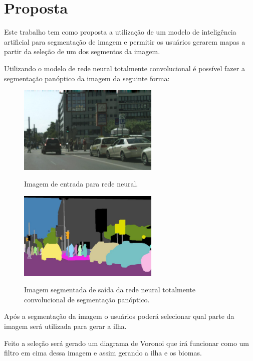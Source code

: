 \section{Proposta}

Este trabalho tem como proposta a utilização de um modelo de inteligência artificial para segmentação de imagem e permitir os usuários gerarem mapas a partir da seleção de um dos segmentos da imagem.

Utilizando o modelo de rede neural totalmente convolucional é possível fazer a segmentação panóptico da imagem da seguinte forma:

\begin{figure}[!ht]
	\centering
    \caption{Imagem de entrada para rede neural.}
	\includegraphics[width=0.6\textwidth]{figures/segmantations_1.png}
	\label{fig:segmantations_1}
\end{figure}

\begin{figure}[!ht]
	\centering
    \caption{Imagem segmentada de saída da rede neural totalmente convolucional de segmentação panóptico.}
	\includegraphics[width=0.6\textwidth]{figures/segmantations_2.png}
	\label{fig:segmantations_2}
\end{figure}

Após a segmentação da imagem o usuários poderá selecionar qual parte da imagem será utilizada para gerar a ilha.

Feito a seleção será gerado um diagrama de Voronoi que irá funcionar como um filtro em cima dessa imagem e assim gerando a ilha e os biomas.

